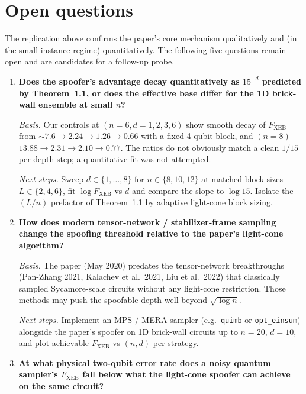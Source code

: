 \section{Open questions}

The replication above confirms the paper's core mechanism qualitatively
and (in the small-instance regime) quantitatively. The following five
questions remain open and are candidates for a follow-up probe.

\begin{enumerate}

\item \textbf{Does the spoofer's advantage decay quantitatively as
  $15^{-d}$ predicted by Theorem~1.1, or does the effective base
  differ for the 1D brick-wall ensemble at small $n$?}

  \emph{Basis.} Our controls at $(n{=}6, d{=}1,2,3,6)$ show smooth
  decay of $F_{\mathrm{XEB}}$ from $\sim\!7.6\to 2.24\to 1.26\to 0.66$
  with a fixed 4-qubit block, and $(n{=}8)$ $13.88\to 2.31\to
  2.10\to 0.77$. The ratios do not obviously match a clean $1/15$ per
  depth step; a quantitative fit was not attempted.

  \emph{Next steps.} Sweep $d\in\{1,\ldots,8\}$ for
  $n\in\{8,10,12\}$ at matched block sizes $L\in\{2,4,6\}$, fit
  $\log F_{\mathrm{XEB}}$ vs $d$ and compare the slope to $\log 15$.
  Isolate the $(L/n)$ prefactor of Theorem~1.1 by adaptive light-cone
  block sizing.

\item \textbf{How does modern tensor-network / stabilizer-frame sampling
  change the spoofing threshold relative to the paper's light-cone
  algorithm?}

  \emph{Basis.} The paper (May 2020) predates the tensor-network
  breakthroughs (Pan-Zhang 2021, Kalachev et al.\ 2021, Liu et al.\
  2022) that classically sampled Sycamore-scale circuits without any
  light-cone restriction. Those methods may push the spoofable depth
  well beyond $\sqrt{\log n}$.

  \emph{Next steps.} Implement an MPS / MERA sampler (e.g.\ \texttt{quimb}
  or \texttt{opt\_einsum}) alongside the paper's spoofer on 1D
  brick-wall circuits up to $n{=}20$, $d{=}10$, and plot achievable
  $F_{\mathrm{XEB}}$ vs $(n,d)$ per strategy.

\item \textbf{At what physical two-qubit error rate does a noisy
  quantum sampler's $F_{\mathrm{XEB}}$ fall below what the light-cone
  spoofer can achieve on the same circuit?}


\end{enumerate}
